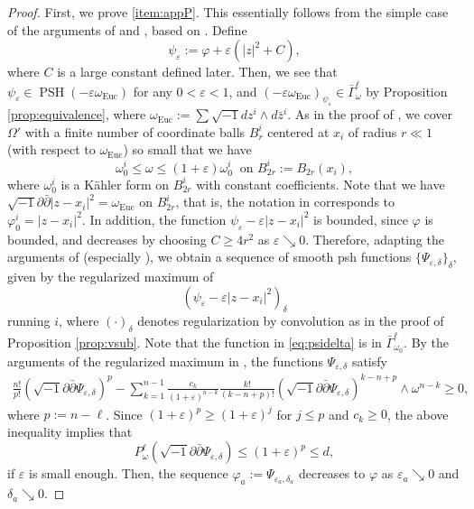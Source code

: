 \documentclass{amsart}
\numberwithin{equation}{section}
\theoremstyle{plain}
\theoremstyle{definition}
\theoremstyle{remark}
\newcommand{\delb}{\sqrt{-1}\partial\bar{\partial}}
\begin{document}
\begin{proof}
   First, we prove \ref{item:appP}. This essentially follows from the simple case of the arguments of \cite[Proposition 4.1]{Datar-Pingali} and \cite[Section 4]{GChen}, based on \cite{BK}. Define $$\psi_\varepsilon:=\varphi+\varepsilon(\vert z\vert^2+C),$$
   where $C$ is a large constant defined later. Then, we see that $\psi_\varepsilon\in\operatorname{PSH}(-\varepsilon\omega_\mathrm{Euc})$ for any $0<\varepsilon<1$, and $(-\varepsilon\omega_{\mathrm{Euc}})_{\psi_\varepsilon}\in\bar{\Gamma}^\ell_\omega$ by Proposition \ref{prop:equivalence}, where $\omega_\mathrm{Euc}:=\sum \sqrt{-1} dz^i\wedge d\bar{z}^i$.
   As in the proof of \cite[Proposition 4.1]{Datar-Pingali}, we cover $\Omega'$ with a finite number of coordinate balls $B^i_r$ centered at $x_i$ of radius $r\ll1$ (with respect to $\omega_\mathrm{Euc}$) so small that we have 
   \begin{equation}\label{eq:constomega}
       \omega_0^i\le\omega\le(1+\varepsilon)\omega_0^i\ \text { on } B^i_{2r}:=B_{2r}(x_i),
   \end{equation}
   where $\omega_0^i$ is a Kähler form on $B^i_{2r}$ with constant coefficients. Note that we have $\delb\vert z-x_i\vert^2=\omega_\mathrm{Euc}$ on $B^i_{2r}$, that is, the notation in \cite{Datar-Pingali} corresponds to $\varphi^i_0=\vert z-x_i\vert^2$. In addition, the function $\psi_\varepsilon-\varepsilon\vert z-x_i\vert^2$ is bounded, since $\varphi$ is bounded, and decreases by choosing $C\ge 4r^2$ as $\varepsilon\searrow0$. 
   Therefore, adapting the arguments of \cite[Proposition 4.1]{Datar-Pingali} (especially \cite[Proposition 4.1 (3)]{GChen}), we obtain a sequence of smooth psh functions $\{\Psi_{\varepsilon,\delta}\}_\delta$, given by the regularized maximum of 
   \begin{equation}\label{eq:psidelta}
       (\psi_\varepsilon-\varepsilon\vert z-x_i\vert^2)_{\delta}
   \end{equation}
   running $i$, where $(\cdot)_{\delta}$ denotes regularization by convolution as in the proof of Proposition \ref{prop:vsub}. Note that the function in \eqref{eq:psidelta} is in $\bar{\Gamma}_{\omega_0}^\ell$. By the arguments of the regularized maximum in \cite[p561--p562]{GChen}, the functions $\Psi_{\varepsilon,\delta}$ satisfy
   \begin{equation}\label{eq:appPineq}
       \begin{aligned}
           \frac{n!}{p!}(\delb\Psi_{\varepsilon,\delta})^p-\sum_{k=1}^{n-1}\frac{c_k}{(1+\varepsilon)^{n-k}}\frac{k!}{(k-n+p)!}(\delb\Psi_{\varepsilon,\delta})^{k-n+p}\wedge\omega^{n-k}\ge0,
       \end{aligned}
   \end{equation}
   where $p:=n-\ell$.
   Since $(1+\varepsilon)^p\ge(1+\varepsilon)^j$ for $j\le p$ and $c_k\ge0$, the above inequality implies that 
   \begin{equation}\label{eq:appPineq'}
       P^\ell_\omega(\delb\Psi_{\varepsilon,\delta})\le\left({1+\varepsilon}\right)^p\le d,
   \end{equation}
   if $\varepsilon$ is small enough.
   Then, the sequence $\varphi_a:=\Psi_{\varepsilon_a,\delta_a}$ decreases to $\varphi$ as $\varepsilon_a\searrow0$ and $\delta_a\searrow0$.


\end{proof}
\end{document}

